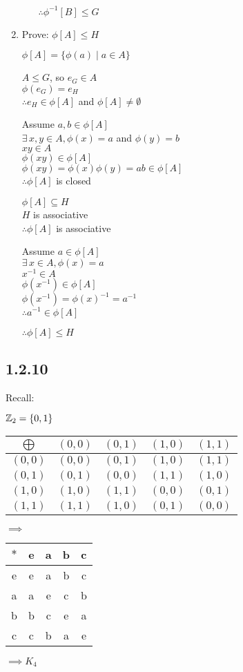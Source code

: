 \documentclass[letterpaper,12pt,fleqn]{article}
\newcommand{\p}{\phi}
\begin{document}
\begin{enumerate}[label=\alph*)]
\begin{enumerate}[label=\arabic*)]
    $\therefore\p^{-1}[B]\le G$
  \end{enumerate}

\item Prove: $\p[A]\le H$

  $\p[A]=\{\p(a)\mid a\in A\}$

  $A\le G$, so $e_G\in A$ \\
  $\p(e_G)=e_H$ \\
  $\therefore e_H\in\p[A]$ and $\p[A]\ne\emptyset$
  
  Assume $a,b\in\p[A]$ \\
  $\exists\,x,y\in A,\p(x)=a$ and $\p(y)=b$ \\
  $xy\in A$ \\
  $\p(xy)\in\p[A]$\\
  $\p(xy)=\p(x)\p(y)=ab\in\p[A]$ \\
  $\therefore\p[A]$ is closed

  $\p[A]\subseteq H$ \\
  $H$ is associative \\
  $\therefore\p[A]$ is associative

  Assume $a\in\p[A]$ \\
  $\exists\,x\in A,\p(x)=a$ \\
  $x^{-1}\in A$ \\
  $\p(x^{-1})\in\p[A]$ \\
  $\p(x^{-1})=\p(x)^{-1}=a^{-1}$ \\
  $\therefore a^{-1}\in\p[A]$

  $\therefore\p[A]\le H$
\end{enumerate}

\subsection*{1.2.10}

Recall:

\bigskip

$\mathbb{Z}_2=\{0,1\}$

\bigskip

\begin{tabular}{c|cccc}
  $\bigoplus$ & $(0,0)$ & $(0,1)$ & $(1,0)$ & $(1,1)$ \\
  \hline
  $(0,0)$ & $(0,0)$ & $(0,1)$ & $(1,0)$ & $(1,1)$ \\
  $(0,1)$ & $(0,1)$ & $(0,0)$ & $(1,1)$ & $(1,0)$ \\
  $(1,0)$ & $(1,0)$ & $(1,1)$ & $(0,0)$ & $(0,1)$ \\
  $(1,1)$ & $(1,1)$ & $(1,0)$ & $(0,1)$ & $(0,0)$ \\
\end{tabular}
$\implies$
\begin{tabular}{c|cccc}
  $*$ & e & a & b & c \\
  \hline
  e & e & a & b & c \\
  a & a & e & c & b \\
  b & b & c & e & a \\
  c & c & b & a & e \\
\end{tabular}
$\implies K_4$
\end{document}
